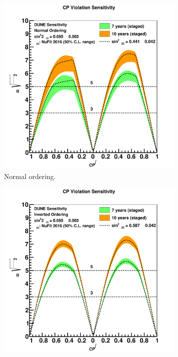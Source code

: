 \begin{figure}
  \centering
  \begin{subfigure}{0.49\textwidth}
    \centering
    \includegraphics[width=\textwidth]{cpv_two_exps_th23band_no_2017}
    \caption{Normal ordering.}
  \end{subfigure}%
  \begin{subfigure}{0.49\textwidth}
    \centering
    \includegraphics[width=\textwidth]{cpv_two_exps_th23band_io_2017}

\end{subfigure}
\end{figure}
